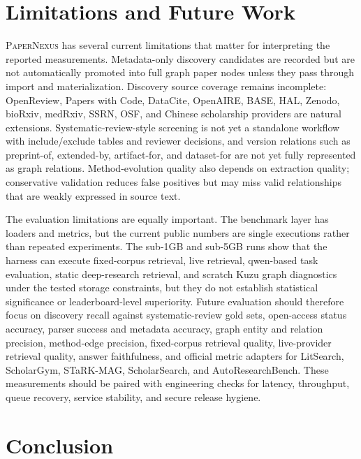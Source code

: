 \documentclass[11pt]{article}
\newcommand{\papernexus}{\textsc{PaperNexus}}
\begin{document}
\section{Limitations and Future Work}

\papernexus{} has several current limitations that matter for interpreting the reported measurements. Metadata-only discovery candidates are recorded but are not automatically promoted into full graph paper nodes unless they pass through import and materialization. Discovery source coverage remains incomplete: OpenReview, Papers with Code, DataCite, OpenAIRE, BASE, HAL, Zenodo, bioRxiv, medRxiv, SSRN, OSF, and Chinese scholarship providers are natural extensions. Systematic-review-style screening is not yet a standalone workflow with include/exclude tables and reviewer decisions, and version relations such as preprint-of, extended-by, artifact-for, and dataset-for are not yet fully represented as graph relations. Method-evolution quality also depends on extraction quality; conservative validation reduces false positives but may miss valid relationships that are weakly expressed in source text.

The evaluation limitations are equally important. The benchmark layer has loaders and metrics, but the current public numbers are single executions rather than repeated experiments. The sub-1GB and sub-5GB runs show that the harness can execute fixed-corpus retrieval, live retrieval, qwen-based task evaluation, static deep-research retrieval, and scratch Kuzu graph diagnostics under the tested storage constraints, but they do not establish statistical significance or leaderboard-level superiority. Future evaluation should therefore focus on discovery recall against systematic-review gold sets, open-access status accuracy, parser success and metadata accuracy, graph entity and relation precision, method-edge precision, fixed-corpus retrieval quality, live-provider retrieval quality, answer faithfulness, and official metric adapters for LitSearch, ScholarGym, STaRK-MAG, ScholarSearch, and AutoResearchBench. These measurements should be paired with engineering checks for latency, throughput, queue recovery, service stability, and secure release hygiene.

\section{Conclusion}
\end{document}
